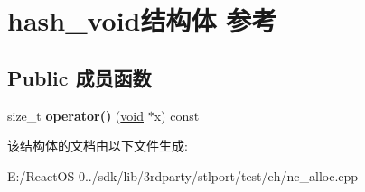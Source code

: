 \hypertarget{structhash__void}{}\section{hash\+\_\+void结构体 参考}
\label{structhash__void}
\subsection*{Public 成员函数}
\begin{DoxyCompactItemize}
\item 
\mbox{\label{structhash__void_a3bd378738f858f1fcd8f3ff6433400df}} 
size\+\_\+t {\bfseries operator()} (\hyperlink{interfacevoid}{void} $\ast$x) const
\end{DoxyCompactItemize}


该结构体的文档由以下文件生成\+:\begin{DoxyCompactItemize}
\item 
E\+:/\+React\+O\+S-\/0../sdk/lib/3rdparty/stlport/test/eh/nc\+\_\+alloc.\+cpp\end{DoxyCompactItemize}
